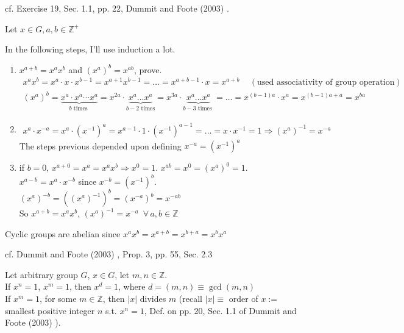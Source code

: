  cf. Exercise 19, Sec. 1.1, pp. 22, Dummit and Foote (2003) \cite{agat:DuFo2003}.

Let $x \in G, a, b\in \mathbb{Z}^+$

In the following steps, I'll use induction a lot.
\begin{enumerate}
	\item[(a)] $x^{a+b} = x^a x^b $ and $(x^a)^b = x^{ab}$, prove.
	\[
	\begin{gathered}
		x^ax^b = x^a \cdot x \cdot x^{b-1} = x^{a+1} x^{b-1} = \dots = x^{a+b - 1} \cdot x = x^{a+b} \quad \, (\text{used associativity of group operation}) \\
		(x^a)^b = \underbrace{x^a \cdot x^a \cdots x^a }_{b \text{ times } } = x^{2a} \cdot \underbrace{x^a \dots x^a}_{ b- 2 \text{ times} } = x^{3a} \cdot \underbrace{x^a \dots x^a }_{b-3 \text{ times } } = \dots = x^{(b-1) a} \cdot x^a = x^{ (b-1) a + a} = x^{ba}
	\end{gathered}
	\]
	\item[(b)] 
	\[
	\begin{gathered}
		x^a \cdot x^{-a} = x^a \cdot (x^{-1})^a = x^{a-1} \cdot 1 \cdot (x^{-1})^{a-1} = \dots = x\cdot x^{-1} = 1 \Longrightarrow (x^a)^{-1} = x^{-a}
	\end{gathered}
	\]
	The steps previous depended upon defining $x^{-a} = (x^{-1})^a$
	\item[(c)] if $b=0$, $x^{a+0} = x^a = x^a x^b \Longrightarrow x^0 = 1$. $x^{ab} = x^0 = (x^a)^0 = 1$. \\
	
	$x^{a-b} = x^a \cdot x^{-b}$ since $x^{-b} = (x^{-1})^b$. \\
	
	$(x^a)^{-b} = ((x^a)^{-1})^b = (x^{-a})^b = x^{-ab}$ \\
	
	So $x^{a+b} = x^a x^b$, $(x^a)^{-1} = x^{-a}$ $\, \forall \, a,b \in \mathbb{Z}$
\end{enumerate}

\begin{theorem}\label{agat:Thm:CyclicGroupsAreAbelian}
	Cyclic groups are abelian since $x^a x^b = x^{a+b} = x^{b+a} = x^b x^a$
\end{theorem}

\begin{proposition}[]\label{agat:Prop:OrderDividesExponentOfCyclicGroupGeneratorRelation}
cf. Dummit and Foote (2003) \cite{agat:DuFo2003}, Prop. 3, pp. 55, Sec. 2.3

	Let arbitrary group $G$, $x\in G$, let $m, n \in \mathbb{Z}$. \\

	If $x^n = 1$, $x^m = 1$, then $x^d =1$, where $d= (m,n) \equiv \gcd{(m,n)}$ \\
	If $x^m = 1$, for some $m \in \mathbb{Z}$, then $|x|$ divides $m$ (recall $|x| \equiv $ order of $x :=$ smallest positive integer $n$ s.t. $x^n = 1$, Def. on pp. 20, Sec. 1.1 of Dummit and Foote (2003) \cite{agat:DuFo2003}).
\end{proposition}

